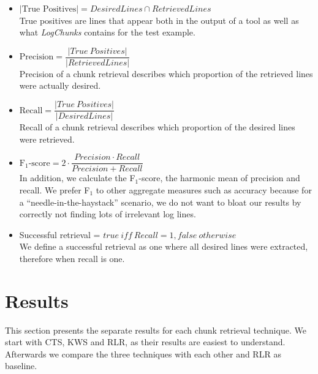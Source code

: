 \vspace{0.2cm}
\begin{itemize}[leftmargin=0.4cm] \itemsep1em
	\item $|\mbox{True\ Positives}| = \mathit{DesiredLines} \cap
	\mathit{RetrievedLines}$ \vspace{0.2cm}\\
	True positives are lines that appear both in the output of a
	tool as well as what \textit{LogChunks} contains for the
  test example.

	\item $\mbox{Precision} = \dfrac{|\mathit{True\
	Positives}|}{|\mathit{RetrievedLines}|}$ \vspace{0.21cm} \\
	Precision of a chunk retrieval describes which proportion of
	the retrieved lines were actually desired.

	\item $\mbox{Recall} =
	\dfrac{|\mathit{True\ Positives}|}{|\mathit{DesiredLines}|}$
	\vspace{0.2cm} \\
	Recall of a chunk retrieval describes which proportion of the
	desired lines were retrieved.
	\item $\mbox{F$_{1}$-score} = 2 \cdot \dfrac{\mathit{Precision}
	\cdot \mathit{Recall}}{\mathit{Precision} + \mathit{Recall}}$
	\vspace{0.2cm}\\
	In addition, we calculate the F$_{1}$-score, the harmonic mean
	of precision and recall.
We prefer F$_{1}$ to other aggregate
	measures such as accuracy because for a
	``needle-in-the-haystack'' scenario, we do not want to bloat
	our results by correctly not finding lots of irrelevant log
	lines.
	\item Successful retrieval = $\mathit{true}\ \mathit{iff}\
	\mathit{Recall} = 1, \mathit{false\ otherwise}$  \vspace{0.2cm} \\
	We define a successful retrieval as one where all desired
	lines were
	extracted, therefore when recall is one.
\end{itemize}


\section{Results}
This section presents the separate results for each chunk retrieval
technique.
We start with CTS, KWS and RLR, as their results are easiest to
understand.
Afterwards we compare the three techniques with each other and RLR as
baseline.


